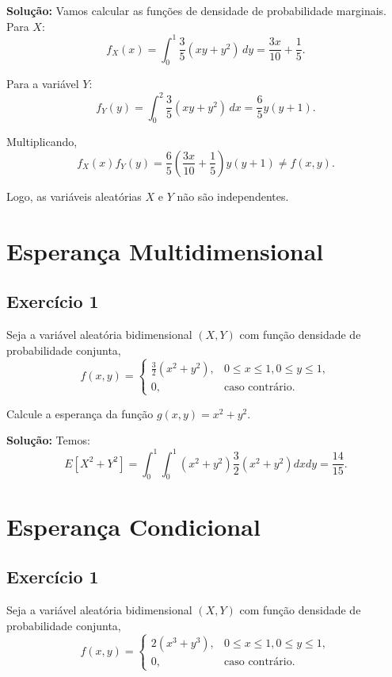 \documentclass{article}
\begin{document}
\vspace{0.5cm}
\textbf{Solução:}
Vamos calcular as funções de densidade de probabilidade marginais.
Para $X$:
    $$
    f_X(x) = \int_0^1 \dfrac{3}{5}(xy + y^2)\,dy 
    = \dfrac{3x}{10} + \dfrac{1}{5}.
    $$

Para a variável $Y$:
    $$
    f_Y(y) = \int_0^2 \dfrac{3}{5}(xy + y^2)\,dx
    = \dfrac{6}{5}y(y + 1).
    $$
    
Multiplicando,
    $$
    f_X(x)f_Y(y) 
    = \dfrac{6}{5}\left(\dfrac{3x}{10} + \dfrac{1}{5}\right)y(y+1) 
    \neq f(x,y).
    $$

Logo, as variáveis aleatórias $X$ e $Y$ não são independentes.

\section{Esperança Multidimensional}
\subsection{Exercício 1}
Seja a variável aleatória bidimensional $(X, Y)$ com função densidade de probabilidade conjunta,
    $$
    f(x,y) = 
    \begin{cases}
    \frac{3}{2}(x^2 + y^2), & 0 \le x \le 1, 0 \le y \le 1,\\
    0, & \text{caso contrário}.
    \end{cases}
    $$

Calcule a esperança da função $g(x,y) = x^2 + y^2$.

\vspace{0.5cm}
\textbf{Solução:} Temos:
    $$
    E[X^2 + Y^2] = \int_{0}^{1}\int_{0}^{1}(x^2 + y^2)\frac{3}{2}(x^2 + y^2) dxdy = \frac{14}{15}.
    $$

\section{Esperança Condicional}
\subsection{Exercício 1}
Seja a variável aleatória bidimensional $(X, Y)$ com função densidade de probabilidade conjunta,
    $$
    f(x,y) = 
    \begin{cases}
    2(x^3 + y^3), & 0 \le x \le 1, 0 \le y \le 1, \\
    0, & \text{caso contrário}.
    \end{cases}
    $$
\end{document}
